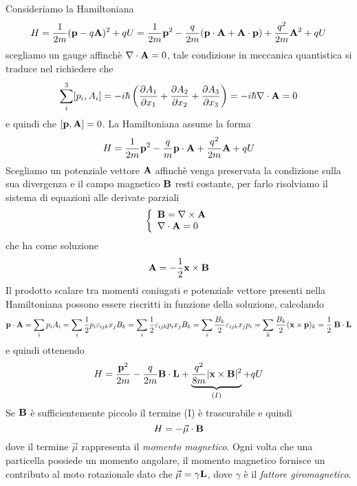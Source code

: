 Consideriamo la Hamiltoniana 
\begin{equation*}
	H = \frac{1}{2m} (\bold{p}-q\bold{A})^2 + qU = \frac{1}{2m}\bold{p}^2 - \frac{q}{2m}(\bold{p} \cdot \bold{A} + \bold{A} \cdot \bold{p}) + \frac{q^2}{2m}\bold{A}^2 + qU
\end{equation*}
\newpage
scegliamo un gauge affinch\`e $\nabla \cdot \bold{A} = 0$, tale condizione in meccanica quantistica si traduce nel richiedere che 
\begin{equation*}
	\sum_{i}^3 [p_i,A_i] = - i \hbar \left ( \frac{\partial A_1}{\partial x_1} + \frac{\partial A_2}{\partial x_2} + \frac{\partial A_3}{\partial x_3}\right) = - i\hbar \nabla \cdot \bold{A} = 0
\end{equation*}
e quindi che $[\bold{p},\bold{A}] = 0$. La Hamiltoniana assume la forma 
\begin{equation}
	H = \frac{1}{2m} \bold{p}^2 -\frac{q}{m} \bold{p} \cdot \bold{A} + \frac{q^2}{2m}\bold{A} + qU
\end{equation}
Scegliamo un potenziale vettore $\bold{A}$ affinch\`e venga preservata la condizione sulla sua divergenza e il campo magnetico $\bold{B}$ resti costante, per farlo risolviamo il sistema di equazioni alle derivate parziali 
\begin{equation*}
	\left \{ \begin{array}{l}
		\bold{B} = \nabla \times \bold{A} \\
		\nabla \cdot \bold{A} = 0
	\end{array}\right.
\end{equation*}
che ha come soluzione  
\begin{equation*}
	\bold{A} = -\frac{1}{2} \bold{x} \times \bold{B}
\end{equation*}
Il prodotto scalare tra momenti coniugati e potenziale vettore presenti nella Hamiltoniana possono essere riscritti in funzione della soluzione, calcolando
\begin{equation*}
	\bold{p} \cdot \bold{A} = \sum_i p_iA_i = \sum_i\frac{1}{2}p_i \varepsilon_{ijk}x_jB_k = \sum_i\frac{1}{2} \varepsilon_{ijk}p_ix_jB_k = \sum_i \frac{B_k}{2}\varepsilon_{ijk}x_jp_i = \sum_k\frac{B_k}{2}(\bold{x} \times \bold{p})_{k} = \frac{1}{2} \;\bold{B} \cdot \bold{L}
\end{equation*}
e quindi ottenendo 
\begin{equation*}
	H = \frac{\bold{p}^2}{2m} - \frac{q}{2m}\bold{B} \cdot \bold{L} + \underbrace{\frac{q^2}{8m}|\bold{x} \times \bold{B}|^2}_{(I)} + qU
\end{equation*}
Se $\bold{B}$ \`e sufficientemente piccolo il termine (I) \`e trascurabile e quindi 
\begin{equation*}
	H = - \vec{\mu} \cdot \bold{B}
\end{equation*}
dove il termine $\vec{\mu}$ rappresenta il \textit{momento magnetico}. Ogni volta che una particella possiede un momento angolare, il momento magnetico fornisce un contributo al moto rotazionale dato che $\vec{\mu} = \gamma \bold{L}$, dove $\gamma$ \`e il \textit{fattore giromagnetico}.

